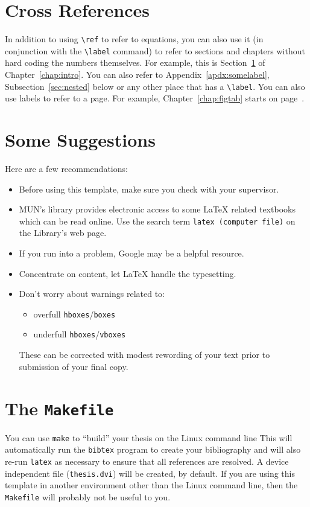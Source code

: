\section{Cross References}
\label{sec:xrefs}

In addition to using \verb+\ref+ to refer to equations, you can also use
it (in conjunction with the \verb+\label+ command) to refer to sections
and chapters without hard coding the numbers themselves.  For example,
this is Section~\ref{sec:xrefs} of Chapter~\ref{chap:intro}.  You can
also refer to Appendix~\ref{apdx:somelabel}, Subsection~\ref{sec:nested}
below or any other place that has a \verb+\label+.  You can also use
labels to refer to a page.  For example, Chapter~\ref{chap:figtab}
starts on page~\pageref{chap:figtab}.

\section{Some Suggestions}

Here are a few recommendations:

\begin{itemize}
	\item Before using this template, make sure you check with
		your supervisor.
	\item MUN's library provides electronic access to some \LaTeX{}
		related textbooks which can be read online.  Use
		the search term \texttt{latex (computer file)} on the
		Library's web page.
	\item If you run into a problem, Google may be a helpful resource.
	\item Concentrate on content, let \LaTeX{} handle the typesetting.
	\item Don't worry about warnings related to:
	\begin{itemize}
		\item overfull \texttt{hboxes}/\texttt{boxes}
		\item underfull \texttt{hboxes}/\texttt{vboxes}
	\end{itemize}
	These can be corrected with modest rewording of your text prior
	to submission of your final copy.
\end{itemize}

\section{The \texttt{Makefile}}

You can use \texttt{make} to ``build'' your thesis on the Linux command
line This will
automatically run the \texttt{bibtex} program to create your bibliography
and will also re-run \texttt{latex} as necessary to ensure that all
references are resolved.  A device independent file (\texttt{thesis.dvi})
will be created, by default.  If you are using this template in another
environment other than the Linux command line, then the \texttt{Makefile}
will probably not be useful to you.

